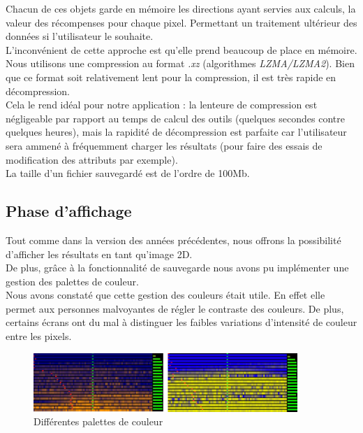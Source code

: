 \documentclass[12pt]{article}
\begin{document}
Chacun de ces objets garde en mémoire les directions ayant servies aux calculs, la valeur des récompenses pour chaque pixel. Permettant un traitement ultérieur des données si l'utilisateur le souhaite. \\

L'inconvénient de cette approche est qu'elle prend beaucoup de place en mémoire. \\

Nous utilisons une compression au format \emph{.xz} (algorithmes \emph{LZMA/LZMA2}). Bien que ce format soit relativement lent pour la compression, il est très rapide en décompression. \\

Cela le rend idéal pour notre application : la lenteure de compression est négligeable par rapport au temps de calcul des outils (quelques secondes contre quelques heures), mais la rapidité de décompression est parfaite car l'utilisateur sera ammené à fréquemment charger les résultats (pour faire des essais de modification des attributs par exemple). \\

La taille d'un fichier sauvegardé est de l'ordre de 100Mb. \\

\newpage
\subsection{Phase d'affichage}

Tout comme dans la version des années précédentes, nous offrons la possibilité d'afficher les résultats en tant qu'image 2D. \\

De plus, grâce à la fonctionnalité de sauvegarde nous avons pu implémenter une gestion des palettes de couleur. \\

Nous avons constaté que cette gestion des couleurs était utile. En effet elle permet aux personnes malvoyantes de régler le contraste des couleurs. De plus, certains écrans ont du mal à distinguer les faibles variations d'intensité de couleur entre les pixels. \\

\begin{figure}[htp]
    \centering
    \includegraphics[width=10cm]{Images/palette}
    \caption{Différentes palettes de couleur}
    \label{fig:palette}
\end{figure}
\end{document}
